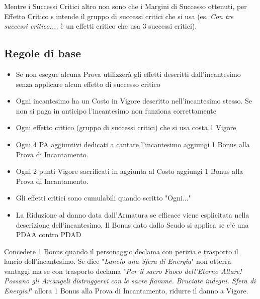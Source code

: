 \documentclass[12pt,a4paper,twoside,openany]{book}
\begin{document}
\begin{multicols}{2}
Mentre i Successi Critici altro non sono che i Margini di Successo ottenuti, per Effetto Critico s intende il gruppo di successi critici che si usa (es. \textit{Con tre successi critico:...} è un effetti critico che usa 3 successi critici).

\subsection{Regole di base}\label{magieregoledibase}

\begin{itemize}

\item 
Se non esegue alcuna Prova utilizzerà gli effetti descritti dall'incantesimo senza applicare alcun effetto di successo critico

\item 
Ogni incantesimo ha un Costo in Vigore descritto nell'incantesimo stesso. Se non si paga in anticipo l'incantesimo non funziona correttamente

\item 
Ogni effetto critico (gruppo di successi critici) che si usa costa 1 Vigore

\item 
Ogni 4 PA aggiuntivi dedicati a cantare l'incantesimo aggiungi 1 Bonus alla Prova di Incantamento.

\item 
Ogni 2 punti Vigore sacrificati in aggiunta al Costo aggiungi 1 Bonus alla Prova di Incantamento.

\item 
Gli effetti critici sono cumulabili quando scritto "Ogni..."

\item 
La Riduzione al danno data dall'Armatura se efficace viene esplicitata nella descrizione dell'incantesimo. Il Bonus dato dallo Scudo si applica se c'è una PDAA contro PDAD

\end{itemize}

\begin{changemargin}{0.3cm}{0.3cm}\begin{narratore}
Concedete 1 Bonus quando il personaggio declama con perizia e trasporto il lancio dell'incantesimo. Se dice "\textit{Lancio una Sfera di Energia}" non otterrà vantaggi ma se con trasporto declama "\textit{Per il sacro Fuoco dell'Eterno Altare! Possano gli Arcangeli distruggervi con le sacre fiamme. Bruciate indegni. Sfera di Energia!}" allora 1 Bonus alla Prova di Incantamento, ridurre il danno a Vigore.
\end{narratore}\end{changemargin}


\end{multicols}
\end{document}
